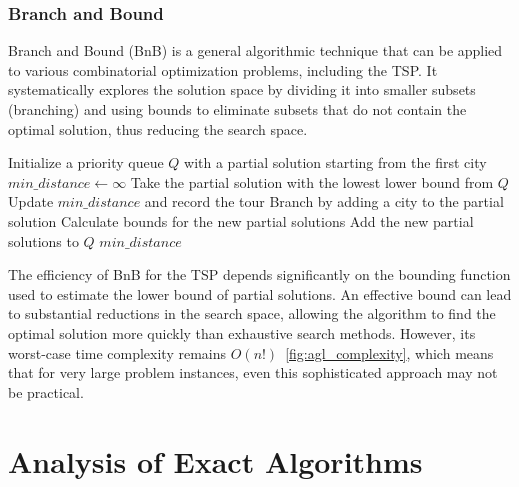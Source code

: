 
\subsubsection{Branch and Bound}

Branch and Bound (\Gls{BnB}) is a general algorithmic technique that can be applied to various combinatorial optimization problems, including the \Gls{TSP}. It systematically explores the solution space by dividing it into smaller subsets (branching) and using bounds to eliminate subsets that do not contain the optimal solution, thus reducing the search space.

\begin{algorithm}
	\caption{\Gls{BnB} for the \Gls{TSP}}\label{branchbound}
	\begin{algorithmic}[1]
		\State Initialize a priority queue $Q$ with a partial solution starting from the first city
		\State $min\_distance \gets \infty$
		\State Take the partial solution with the lowest lower bound from $Q$
		\State Update $min\_distance$ and record the tour
		\EndIf
		\Else
		\State Branch by adding a city to the partial solution
		\State Calculate bounds for the new partial solutions
		\State Add the new partial solutions to $Q$
		\EndIf
		\EndWhile
		\State \Return $min\_distance$
		\EndProcedure
	\end{algorithmic}
\end{algorithm}

The efficiency of \Gls{BnB} for the \Gls{TSP} depends significantly on the bounding function used to estimate the lower bound of partial solutions. An effective bound can lead to substantial reductions in the search space, allowing the algorithm to find the optimal solution more quickly than exhaustive search methods. However, its worst-case time complexity remains $O(n!)$~\ref{fig:agl_complexity}, which means that for very large problem instances, even this sophisticated approach may not be practical.

\section{Analysis of Exact Algorithms}


